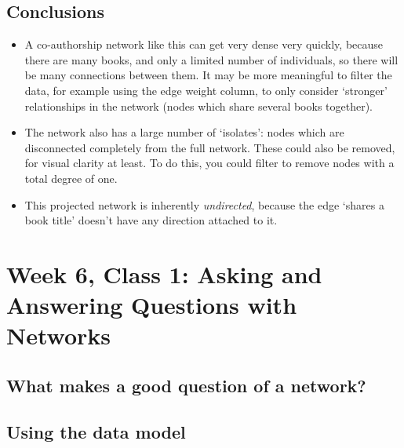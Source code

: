 \documentclass[
]{book}
\begin{document}
\hypertarget{conclusions-3}{%
\section{Conclusions}\label{conclusions-3}}

\begin{itemize}
\item
  A co-authorship network like this can get very dense very quickly, because there are many books, and only a limited number of individuals, so there will be many connections between them. It may be more meaningful to filter the data, for example using the edge weight column, to only consider `stronger' relationships in the network (nodes which share several books together).
\item
  The network also has a large number of `isolates': nodes which are disconnected completely from the full network. These could also be removed, for visual clarity at least. To do this, you could filter to remove nodes with a total degree of one.
\item
  This projected network is inherently \emph{undirected}, because the edge `shares a book title' doesn't have any direction attached to it.
\end{itemize}

\hypertarget{section}{%
\section{}\label{section}}

\hypertarget{week-6-class-1-asking-and-answering-questions-with-networks}{%
\chapter{Week 6, Class 1: Asking and Answering Questions with Networks}\label{week-6-class-1-asking-and-answering-questions-with-networks}}

\hypertarget{what-makes-a-good-question-of-a-network}{%
\section{What makes a good question of a network?}\label{what-makes-a-good-question-of-a-network}}

\hypertarget{using-the-data-model}{%
\section{Using the data model}\label{using-the-data-model}}
\end{document}
